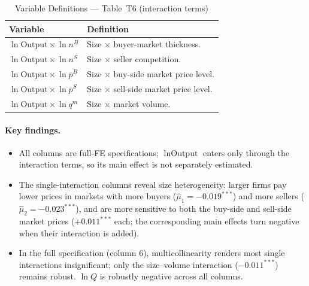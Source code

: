 \documentclass[12pt]{article}
\begin{document}
\begin{table}[H]
  \centering
  \caption{Variable Definitions --- Table~T6 (interaction terms)}
  \label{tab:vardef_t6}
  \begin{tabular}{L{3.8cm} L{10.2cm}}
    \toprule
    Variable & Definition \\
    \midrule
    \(\ln\text{Output} \times \ln n^{B}\) &
      Size \(\times\) buyer-market thickness.  \\[4pt]
    \(\ln\text{Output} \times \ln n^{S}\) &
      Size \(\times\) seller competition.  \\[4pt]
    \(\ln\text{Output} \times \ln\bar{p}^{B}\) &
      Size \(\times\) buy-side market price level. \\[4pt]
    \(\ln\text{Output} \times \ln\bar{p}^{S}\) &
      Size \(\times\) sell-side market price level. \\[4pt]
    \(\ln\text{Output} \times \ln q^{m}\) &
      Size \(\times\) market volume.  \\
    \bottomrule
  \end{tabular}
\end{table}

\paragraph{Key findings.}
\begin{itemize}[leftmargin=1.5em,nosep]
  \item All columns are full-FE specifications; \(\ln\text{Output}\) enters only
    through the interaction terms, so its main effect is not separately
    estimated.
  \item The single-interaction columns reveal size heterogeneity: larger firms
    pay lower prices in markets with more buyers (\(\hat\mu_1 = -0.019^{***}\))
    and more sellers (\(\hat\mu_2 = -0.023^{***}\)), and are more sensitive to
    both the buy-side and sell-side market prices (\(+0.011^{***}\) each; the
    corresponding main effects turn negative when their interaction is added).
  \item In the full specification (column 6), multicollinearity renders most
    single interactions insignificant; only the size--volume interaction
    (\(-0.011^{***}\)) remains robust. \(\ln Q\) is robustly negative across all
    columns.
\end{itemize}
\end{document}
